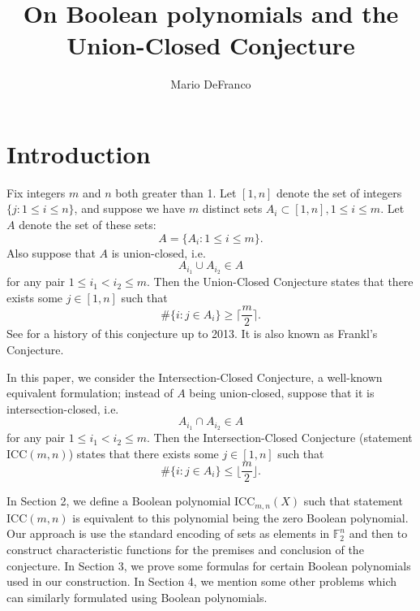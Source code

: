 \documentclass[11pt, oneside]{article}   	%
\begin{document}
\title{On Boolean polynomials and the Union-Closed Conjecture}
\author{Mario DeFranco}
\maketitle


\section{Introduction} 

Fix integers $m$ and $n$ both greater than 1. Let $[1,n]$ denote the set of integers $\{ j \colon 1 \leq i \leq n\}$, and suppose we have $m$ distinct sets $A_i \subset [1,n], 1 \leq i \leq m$. Let $A$ denote the set of these sets: 
\[
A = \{A_i \colon 1 \leq i \leq m\}.
\]
Also suppose that $A$ is union-closed, i.e.
\[
A_{i_1} \cup A_{i_2}  \in A
\]
for any pair $1 \leq i_1 <i_2 \leq m$. 
Then the Union-Closed Conjecture states that there exists some $j \in [1,n]$ such that 
\[
\#\{ i \colon j \in A_i \} \geq \lceil \frac{m}{2} \rceil.
\]
See \cite{Bruhn} for a history of this conjecture up to 2013. It is also known as Frankl's Conjecture. 

In this paper, we consider the Intersection-Closed Conjecture, a well-known equivalent formulation; instead of $A$ being union-closed, suppose that it is intersection-closed, i.e. 
\[
A_{i_1} \cap A_{i_2}  \in A
\]
for any pair $1 \leq i_1 <i_2 \leq m$. Then the Intersection-Closed Conjecture (statement ICC$(m,n)$) states that there exists some $j \in [1,n]$ such that 
\[
\#\{ i \colon j \in A_i \} \leq \lfloor \frac{m}{2} \rfloor.
\]

In Section 2, we define a Boolean polynomial $\mathrm{ICC}_{m,n}(X)$ such that statement ICC$(m,n)$ is equivalent to this polynomial being the zero Boolean polynomial. Our approach is use the standard encoding of sets as elements in $\mathbb{F}_2^n$ and then to construct characteristic functions for the premises and conclusion of the conjecture. In Section 3, we prove some formulas for certain Boolean polynomials used in our construction. In Section 4, we mention some other problems which can similarly formulated using Boolean polynomials.  
\end{document}
